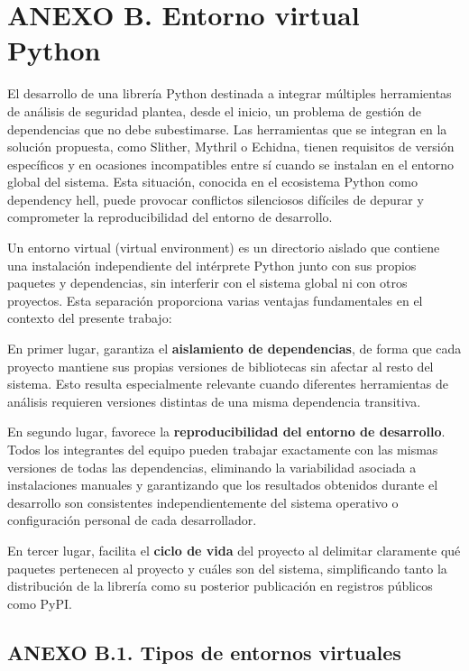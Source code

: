 \section{ANEXO B. Entorno virtual
Python}\label{anexo-b.-entorno-virtual-python}

El desarrollo de una librería Python destinada a integrar múltiples
herramientas de análisis de seguridad plantea, desde el inicio, un
problema de gestión de dependencias que no debe subestimarse. Las
herramientas que se integran en la solución propuesta, como Slither,
Mythril o Echidna, tienen requisitos de versión específicos y en
ocasiones incompatibles entre sí cuando se instalan en el entorno global
del sistema. Esta situación, conocida en el ecosistema Python como
dependency hell, puede provocar conflictos silenciosos difíciles de
depurar y comprometer la reproducibilidad del entorno de desarrollo.

Un entorno virtual (virtual environment) es un directorio aislado que
contiene una instalación independiente del intérprete Python junto con
sus propios paquetes y dependencias, sin interferir con el sistema
global ni con otros proyectos. Esta separación proporciona varias
ventajas fundamentales en el contexto del presente trabajo:

En primer lugar, garantiza el \textbf{aislamiento de dependencias}, de
forma que cada proyecto mantiene sus propias versiones de bibliotecas
sin afectar al resto del sistema. Esto resulta especialmente relevante
cuando diferentes herramientas de análisis requieren versiones distintas
de una misma dependencia transitiva.

En segundo lugar, favorece la \textbf{reproducibilidad del entorno de
desarrollo}. Todos los integrantes del equipo pueden trabajar
exactamente con las mismas versiones de todas las dependencias,
eliminando la variabilidad asociada a instalaciones manuales y
garantizando que los resultados obtenidos durante el desarrollo son
consistentes independientemente del sistema operativo o configuración
personal de cada desarrollador.

En tercer lugar, facilita el \textbf{ciclo de vida} del proyecto al
delimitar claramente qué paquetes pertenecen al proyecto y cuáles son
del sistema, simplificando tanto la distribución de la librería como su
posterior publicación en registros públicos como PyPI.

\subsection{ANEXO B.1. Tipos de entornos
virtuales}\label{anexo-b.1.-tipos-de-entornos-virtuales}

